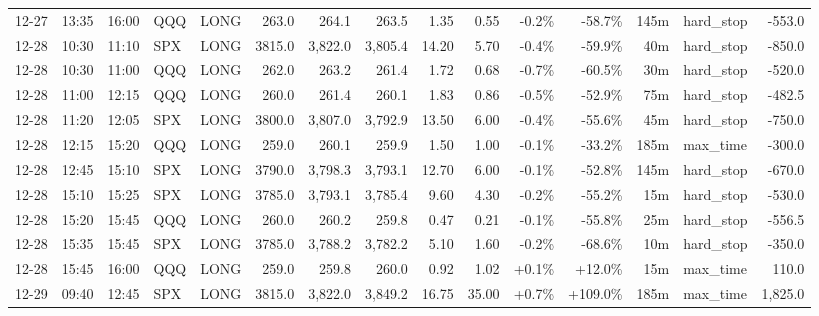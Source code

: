 \documentclass[11pt,a4paper,twoside]{article}
\begin{document}
\begin{landscape}
\begin{center}
\begin{longtable}{>{\color{txtmain}}l l l l l r r r r r r r r >{\color{txtmain}}l r}
12-27 & 13:35 & 16:00 & QQQ & LONG & 263.0 & 264.1 & 263.5 & 1.35 & 0.55 & \textcolor{lossred}{-0.2\%} & \textcolor{lossred}{-58.7\%} & 145m & hard\_stop & \textcolor{lossred}{-553.0} \\
12-28 & 10:30 & 11:10 & SPX & LONG & 3815.0 & 3,822.0 & 3,805.4 & 14.20 & 5.70 & \textcolor{lossred}{-0.4\%} & \textcolor{lossred}{-59.9\%} & 40m & hard\_stop & \textcolor{lossred}{-850.0} \\
12-28 & 10:30 & 11:00 & QQQ & LONG & 262.0 & 263.2 & 261.4 & 1.72 & 0.68 & \textcolor{lossred}{-0.7\%} & \textcolor{lossred}{-60.5\%} & 30m & hard\_stop & \textcolor{lossred}{-520.0} \\
12-28 & 11:00 & 12:15 & QQQ & LONG & 260.0 & 261.4 & 260.1 & 1.83 & 0.86 & \textcolor{lossred}{-0.5\%} & \textcolor{lossred}{-52.9\%} & 75m & hard\_stop & \textcolor{lossred}{-482.5} \\
12-28 & 11:20 & 12:05 & SPX & LONG & 3800.0 & 3,807.0 & 3,792.9 & 13.50 & 6.00 & \textcolor{lossred}{-0.4\%} & \textcolor{lossred}{-55.6\%} & 45m & hard\_stop & \textcolor{lossred}{-750.0} \\
12-28 & 12:15 & 15:20 & QQQ & LONG & 259.0 & 260.1 & 259.9 & 1.50 & 1.00 & \textcolor{lossred}{-0.1\%} & \textcolor{lossred}{-33.2\%} & 185m & max\_time & \textcolor{lossred}{-300.0} \\
12-28 & 12:45 & 15:10 & SPX & LONG & 3790.0 & 3,798.3 & 3,793.1 & 12.70 & 6.00 & \textcolor{lossred}{-0.1\%} & \textcolor{lossred}{-52.8\%} & 145m & hard\_stop & \textcolor{lossred}{-670.0} \\
12-28 & 15:10 & 15:25 & SPX & LONG & 3785.0 & 3,793.1 & 3,785.4 & 9.60 & 4.30 & \textcolor{lossred}{-0.2\%} & \textcolor{lossred}{-55.2\%} & 15m & hard\_stop & \textcolor{lossred}{-530.0} \\
12-28 & 15:20 & 15:45 & QQQ & LONG & 260.0 & 260.2 & 259.8 & 0.47 & 0.21 & \textcolor{lossred}{-0.1\%} & \textcolor{lossred}{-55.8\%} & 25m & hard\_stop & \textcolor{lossred}{-556.5} \\
12-28 & 15:35 & 15:45 & SPX & LONG & 3785.0 & 3,788.2 & 3,782.2 & 5.10 & 1.60 & \textcolor{lossred}{-0.2\%} & \textcolor{lossred}{-68.6\%} & 10m & hard\_stop & \textcolor{lossred}{-350.0} \\
12-28 & 15:45 & 16:00 & QQQ & LONG & 259.0 & 259.8 & 260.0 & 0.92 & 1.02 & \textcolor{wingreen}{+0.1\%} & \textcolor{wingreen}{+12.0\%} & 15m & max\_time & \textcolor{wingreen}{110.0} \\
12-29 & 09:40 & 12:45 & SPX & LONG & 3815.0 & 3,822.0 & 3,849.2 & 16.75 & 35.00 & \textcolor{wingreen}{+0.7\%} & \textcolor{wingreen}{+109.0\%} & 185m & max\_time & \textcolor{wingreen}{1,825.0} \\

\end{longtable}
\end{center}
\end{landscape}
\end{document}
